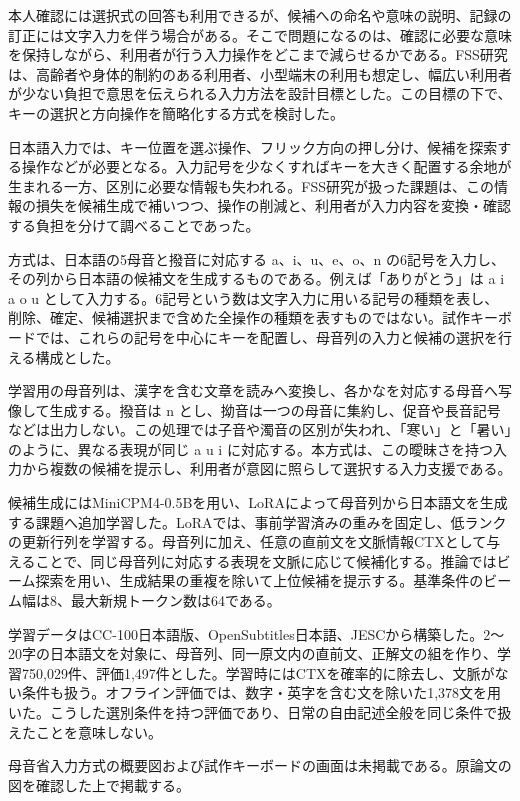 本人確認には選択式の回答も利用できるが、候補への命名や意味の説明、記録の訂正には文字入力を伴う場合がある。そこで問題になるのは、確認に必要な意味を保持しながら、利用者が行う入力操作をどこまで減らせるかである。FSS研究は、高齢者や身体的制約のある利用者、小型端末の利用も想定し、幅広い利用者が少ない負担で意思を伝えられる入力方法を設計目標とした。この目標の下で、キーの選択と方向操作を簡略化する方式を検討した。

日本語入力では、キー位置を選ぶ操作、フリック方向の押し分け、候補を探索する操作などが必要となる。入力記号を少なくすればキーを大きく配置する余地が生まれる一方、区別に必要な情報も失われる。FSS研究が扱った課題は、この情報の損失を候補生成で補いつつ、操作の削減と、利用者が入力内容を変換・確認する負担を分けて調べることであった。

方式は、日本語の5母音と撥音に対応する a、i、u、e、o、n の6記号を入力し、その列から日本語の候補文を生成するものである。例えば「ありがとう」は a i a o u として入力する。6記号という数は文字入力に用いる記号の種類を表し、削除、確定、候補選択まで含めた全操作の種類を表すものではない。試作キーボードでは、これらの記号を中心にキーを配置し、母音列の入力と候補の選択を行える構成とした。

学習用の母音列は、漢字を含む文章を読みへ変換し、各かなを対応する母音へ写像して生成する。撥音は n とし、拗音は一つの母音に集約し、促音や長音記号などは出力しない。この処理では子音や濁音の区別が失われ、「寒い」と「暑い」のように、異なる表現が同じ a u i に対応する。本方式は、この曖昧さを持つ入力から複数の候補を提示し、利用者が意図に照らして選択する入力支援である。

候補生成にはMiniCPM4-0.5Bを用い、LoRAによって母音列から日本語文を生成する課題へ追加学習した。LoRAでは、事前学習済みの重みを固定し、低ランクの更新行列を学習する。母音列に加え、任意の直前文を文脈情報CTXとして与えることで、同じ母音列に対応する表現を文脈に応じて候補化する。推論ではビーム探索を用い、生成結果の重複を除いて上位候補を提示する。基準条件のビーム幅は8、最大新規トークン数は64である。

学習データはCC-100日本語版、OpenSubtitles日本語、JESCから構築した。2〜20字の日本語文を対象に、母音列、同一原文内の直前文、正解文の組を作り、学習750,029件、評価1,497件とした。学習時にはCTXを確率的に除去し、文脈がない条件も扱う。オフライン評価では、数字・英字を含む文を除いた1,378文を用いた。こうした選別条件を持つ評価であり、日常の自由記述全般を同じ条件で扱えたことを意味しない。

母音省入力方式の概要図および試作キーボードの画面は未掲載である。原論文の図を確認した上で掲載する。


